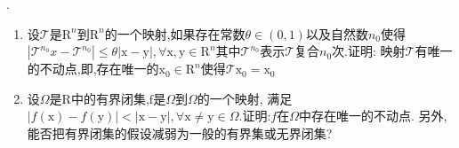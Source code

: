 \documentclass[a4paper,12pt]{article}
\begin{document}
.
\begin{enumerate}
  \item 设$\mathcal{T}$是$\mathrm{R}^n$到$\mathrm{R}^n$的一个映射,如果存在常数$\theta\in(0,1)$以及自然数$n_0$使得\(|\mathcal{T}^{n_0}x-\mathcal{T}^{n_0}|\leq\theta|\mathrm{x}-\mathrm{y}|,\forall \mathrm{x},\mathrm{y}\in\mathrm{R}^n\)其中$\mathcal{T}^{n_0}$表示$\mathcal{T}$复合$n_0$次.证明: 映射$\mathcal{T}$有唯一的不动点,即,存在唯一的$\mathrm{x}_0\in\mathrm{R}^n$使得$\mathcal{T}\mathrm{x}_0=\mathrm{x}_0$
  \item 设$\Omega$是$\mathrm{R}$中的有界闭集,$\mathrm{f}$是$\Omega$到$\Omega$的一个映射, 满足\(|f(\mathrm{x})-f(\mathrm{y})|<|\mathrm{x}-\mathrm{y}|,\forall \mathrm{x}\neq\mathrm{y}\in\Omega.\)证明:$f$在$\Omega$中存在唯一的不动点. 另外,能否把有界闭集的假设减弱为一般的有界集或无界闭集?
\end{enumerate}
\end{document}
